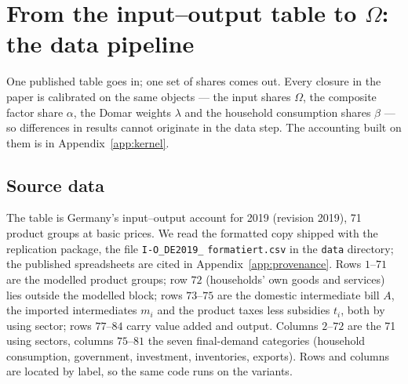 \section{From the input--output table to $\Omega$: the data pipeline}\label{app:pipeline}

One published table goes in; one set of shares comes out. Every closure in the
paper is calibrated on the same objects --- the input shares $\Omega$, the
composite factor share $\alpha$, the Domar weights $\lambda$ and the household
consumption shares $\beta$ --- so differences in results cannot originate in the
data step. The accounting built on them is in Appendix~\ref{app:kernel}.

\subsection{Source data}\label{app:pipeline-source}

The table is Germany's input--output account for 2019 (revision 2019), 71
product groups at basic prices. We read the formatted copy shipped with the
replication package, the file \texttt{I-O\_DE2019\_}
\texttt{formatiert.csv} in the \texttt{data} directory; the published
spreadsheets are cited in Appendix~\ref{app:provenance}. Rows $1$--$71$ are the
modelled product groups; row $72$ (households' own goods and services) lies
outside the modelled block; rows $73$--$75$ are the domestic intermediate bill
$A$, the imported intermediates $m_i$ and the product taxes less subsidies
$t_i$, both by using sector; rows $77$--$84$ carry value added and output.
Columns $2$--$72$ are the 71 using sectors, columns $75$--$81$ the seven
final-demand categories (household consumption, government, investment,
inventories, exports). Rows and columns are located by
label, so the same code runs on the variants.

